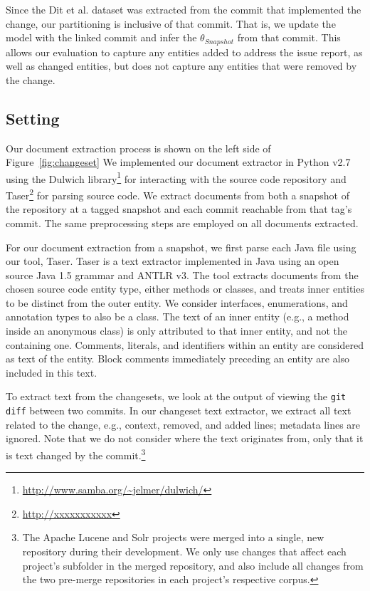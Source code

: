 Since the Dit et al. dataset was extracted from the commit that implemented the
change, our partitioning is inclusive of that commit.  That is, we update
the model with the linked commit and infer the $\theta_{Snapshot}$ from that
commit.  This allows our evaluation to capture any entities added to address
the issue report, as well as changed entities, but does not capture any
entities that were removed by the change.





\subsection{Setting}

Our document extraction process is shown on the left side of Figure~\ref{fig:changeset}
We implemented our document extractor in Python v2.7
using the Dulwich library\footnote{\url{http://www.samba.org/~jelmer/dulwich/}}
for interacting with the source code repository and
Taser\footnote{\url{http://xxxxxxxxxxx}} for parsing source code.
We extract documents from both a snapshot of the repository at a tagged
snapshot and each commit reachable from that tag's commit.
The same preprocessing steps are employed on all documents extracted.

For our document extraction from a snapshot, we first parse each Java file
using our tool, Taser.  Taser is a text extractor implemented in Java using an
open source Java 1.5 grammar and ANTLR v3.  The tool extracts documents from
the chosen source code entity type, either methods or classes, and treats inner
entities to be distinct from the outer entity.  We consider interfaces,
enumerations, and annotation types to also be a class.  The text of an inner
entity (e.g., a method inside an anonymous class) is only attributed to that
inner entity, and not the containing one.  Comments, literals, and identifiers
within an entity are considered as text of the entity.  Block comments
immediately preceding an entity are also included in this text.

To extract text from the changesets, we look at the output of viewing the
\texttt{git diff} between two commits.  In our changeset text extractor, we
extract all text related to the change, e.g., context, removed, and added
lines; metadata lines are ignored.  Note that we do not consider where the text
originates from, only that it is text changed by the commit.\footnote{ The
Apache Lucene and Solr projects were merged into a single, new repository
during their development.  We only use changes that affect each project's
subfolder in the merged repository, and also include all changes from the two
pre-merge repositories in each project's respective corpus.  }

